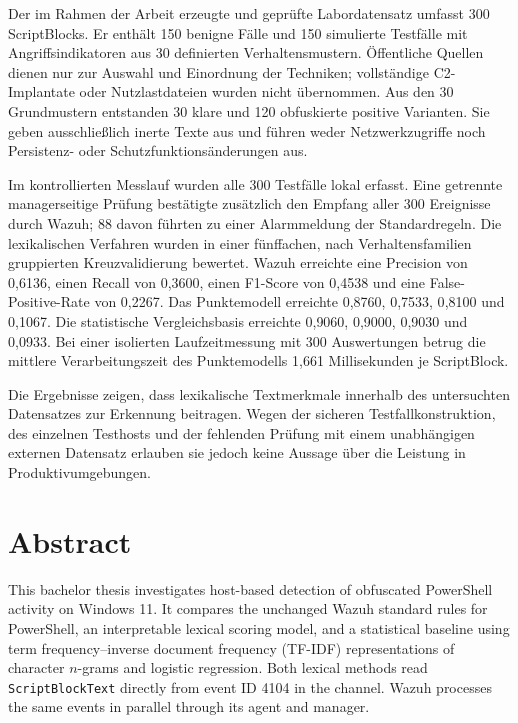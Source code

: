 \documentclass[12pt,a4paper,oneside,parskip=half]{scrreprt}
\begin{document}
Der im Rahmen der Arbeit erzeugte und geprüfte Labordatensatz umfasst 300 ScriptBlocks. Er enthält 150 benigne Fälle und 150 simulierte Testfälle mit Angriffsindikatoren aus 30 definierten Verhaltensmustern. Öffentliche Quellen dienen nur zur Auswahl und Einordnung der Techniken; vollständige C2-Implantate oder Nutzlastdateien wurden nicht übernommen. Aus den 30 Grundmustern entstanden 30 klare und 120 obfuskierte positive Varianten. Sie geben ausschließlich inerte Texte aus und führen weder Netzwerkzugriffe noch Persistenz- oder Schutzfunktionsänderungen aus.

Im kontrollierten Messlauf wurden alle 300 Testfälle lokal erfasst. Eine getrennte managerseitige Prüfung bestätigte zusätzlich den Empfang aller 300 Ereignisse durch Wazuh; 88 davon führten zu einer Alarmmeldung der Standardregeln. Die lexikalischen Verfahren wurden in einer fünffachen, nach Verhaltensfamilien gruppierten Kreuzvalidierung bewertet. Wazuh erreichte eine Precision von 0{,}6136, einen Recall von 0{,}3600, einen F1-Score von 0{,}4538 und eine False-Positive-Rate von 0{,}2267. Das Punktemodell erreichte 0{,}8760, 0{,}7533, 0{,}8100 und 0{,}1067. Die statistische Vergleichsbasis erreichte 0{,}9060, 0{,}9000, 0{,}9030 und 0{,}0933. Bei einer isolierten Laufzeitmessung mit 300 Auswertungen betrug die mittlere Verarbeitungszeit des Punktemodells 1{,}661 Millisekunden je ScriptBlock.

Die Ergebnisse zeigen, dass lexikalische Textmerkmale innerhalb des untersuchten Datensatzes zur Erkennung beitragen. Wegen der sicheren Testfallkonstruktion, des einzelnen Testhosts und der fehlenden Prüfung mit einem unabhängigen externen Datensatz erlauben sie jedoch keine Aussage über die Leistung in Produktivumgebungen.
\clearpage

\chapter*{Abstract}
This bachelor thesis investigates host-based detection of obfuscated PowerShell activity on Windows 11. It compares the unchanged Wazuh standard rules for PowerShell, an interpretable lexical scoring model, and a statistical baseline using term frequency--inverse document frequency (TF-IDF) representations of character \(n\)-grams and logistic regression. Both lexical methods read \texttt{ScriptBlockText} directly from event ID 4104 in the  channel. Wazuh processes the same events in parallel through its agent and manager.
\end{document}
